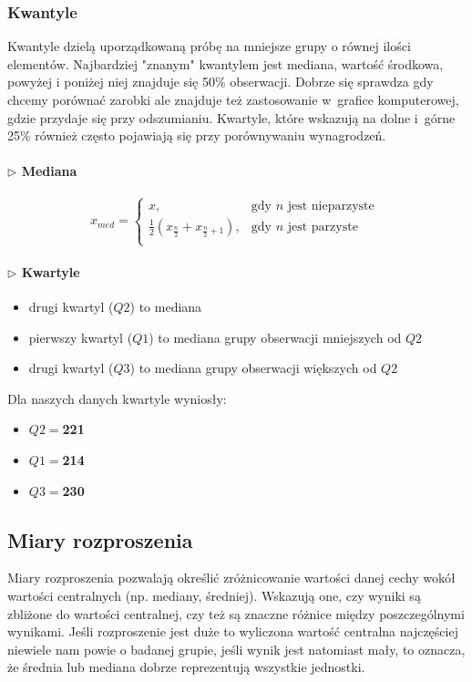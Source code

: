 \documentclass{article}
\theoremstyle{break}
\begin{document}
	\subsubsection*{Kwantyle}
	Kwantyle dzielą uporządkowaną próbę na mniejsze grupy o równej ilości elementów. Najbardziej "znanym" kwantylem jest mediana, wartość środkowa, powyżej i poniżej niej znajduje się 50\% obserwacji. Dobrze się sprawdza gdy chcemy porównać zarobki ale znajduje też zastosowanie w~grafice komputerowej, gdzie przydaje się przy odszumianiu. Kwartyle, które wskazują na dolne i~górne 25\% również często pojawiają się przy porównywaniu wynagrodzeń.
	\paragraph{$\triangleright$ Mediana}
	$$x_{med}=
	\begin{cases}
		x, &  \text{gdy $n$ jest nieparzyste }\\
		\frac{1}{2}(x_{\frac{n}{2}}+x_{\frac{n}{2}+1}), &  \text{gdy $n$ jest parzyste}\\
	\end{cases}$$
	\paragraph{$\triangleright$ Kwartyle}
	\begin{itemize}
		\item drugi kwartyl ($Q2$) to mediana
		\item pierwszy kwartyl ($Q1$) to mediana grupy obserwacji mniejszych od $Q2$
		\item drugi kwartyl ($Q3$) to mediana grupy obserwacji większych od $Q2$
	\end{itemize}
	Dla naszych danych kwartyle wyniosły:
	\begin{itemize}
		\item $Q2 = $\textbf{221}
		\item $Q1 = $\textbf{214}
		\item $Q3 = $\textbf{230}
	\end{itemize}
	\subsection{Miary rozproszenia}
	
	Miary rozproszenia pozwalają określić zróżnicowanie wartości danej cechy wokół wartości centralnych (np. mediany, średniej).  Wskazują one, czy wyniki są zbliżone do wartości centralnej, czy też są znaczne różnice między poszczególnymi wynikami. Jeśli rozproszenie jest duże to wyliczona wartość centralna najczęściej niewiele nam powie o badanej grupie, jeśli wynik jest natomiast mały, to oznacza, że średnia lub mediana dobrze reprezentują wszystkie jednostki.
	
\end{document}

